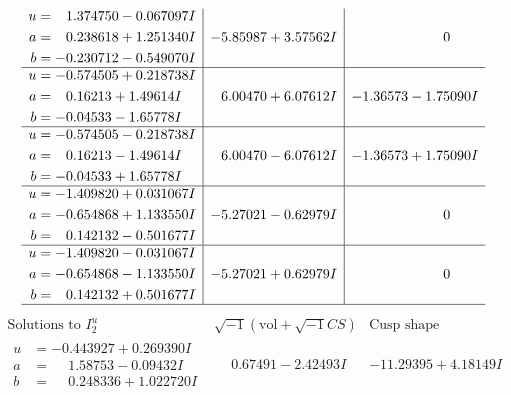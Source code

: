 \documentclass[1p]{elsarticle_modified}
\theoremstyle{definition}
\newcommand{\I}{\sqrt{-1}}
\begin{document}
$$\begin{array}{c|c|c}
\begin{aligned}
u &= \phantom{-}1.374750 - 0.067097 I \\
a &= \phantom{-}0.238618 + 1.251340 I \\
b &= -0.230712 - 0.549070 I\end{aligned}
 & -5.85987 + 3.57562 I & \phantom{-0.000000 } 0 \\ \hline\begin{aligned}
u &= -0.574505 + 0.218738 I \\
a &= \phantom{-}0.16213 + 1.49614 I \\
b &= -0.04533 - 1.65778 I\end{aligned}
 & \phantom{-}6.00470 + 6.07612 I & -1.36573 - 1.75090 I \\ \hline\begin{aligned}
u &= -0.574505 - 0.218738 I \\
a &= \phantom{-}0.16213 - 1.49614 I \\
b &= -0.04533 + 1.65778 I\end{aligned}
 & \phantom{-}6.00470 - 6.07612 I & -1.36573 + 1.75090 I \\ \hline\begin{aligned}
u &= -1.409820 + 0.031067 I \\
a &= -0.654868 + 1.133550 I \\
b &= \phantom{-}0.142132 - 0.501677 I\end{aligned}
 & -5.27021 - 0.62979 I & \phantom{-0.000000 } 0 \\ \hline\begin{aligned}
u &= -1.409820 - 0.031067 I \\
a &= -0.654868 - 1.133550 I \\
b &= \phantom{-}0.142132 + 0.501677 I\end{aligned}
 & -5.27021 + 0.62979 I & \phantom{-0.000000 } 0\\
 \hline 
 \end{array}$$\newpage$$\begin{array}{c|c|c}  
\text{Solutions to }I^u_{2}& \I (\text{vol} + \sqrt{-1}CS) & \text{Cusp shape}\\
 \hline 
\begin{aligned}
u &= -0.443927 + 0.269390 I \\
a &= \phantom{-}1.58753 - 0.09432 I \\
b &= \phantom{-}0.248336 + 1.022720 I\end{aligned}
 & \phantom{-}0.67491 - 2.42493 I & -11.29395 + 4.18149 I \\ \hline\begin{aligned}

\end{aligned}
\end{array}$$
\end{document}
